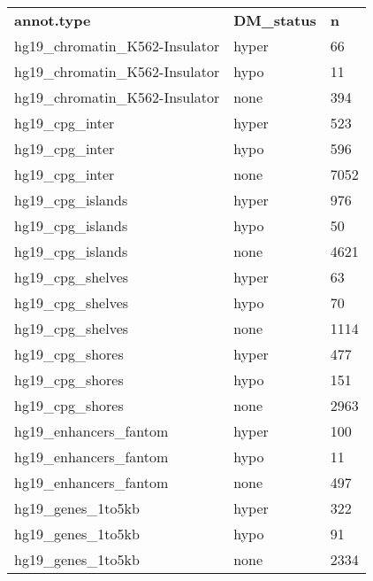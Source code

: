\newpage

\begin{table}[!ht]
\small
\centering
\begin{tabular}{lll}
\textbf{annot.type}             & \textbf{DM\_status} & \textbf{n} \\
hg19\_chromatin\_K562-Insulator & hyper               & 66         \\
hg19\_chromatin\_K562-Insulator & hypo                & 11         \\
hg19\_chromatin\_K562-Insulator & none                & 394        \\
hg19\_cpg\_inter                & hyper               & 523        \\
hg19\_cpg\_inter                & hypo                & 596        \\
hg19\_cpg\_inter                & none                & 7052       \\
hg19\_cpg\_islands              & hyper               & 976        \\
hg19\_cpg\_islands              & hypo                & 50         \\
hg19\_cpg\_islands              & none                & 4621       \\
hg19\_cpg\_shelves              & hyper               & 63         \\
hg19\_cpg\_shelves              & hypo                & 70         \\
hg19\_cpg\_shelves              & none                & 1114       \\
hg19\_cpg\_shores               & hyper               & 477        \\
hg19\_cpg\_shores               & hypo                & 151        \\
hg19\_cpg\_shores               & none                & 2963       \\
hg19\_enhancers\_fantom         & hyper               & 100        \\
hg19\_enhancers\_fantom         & hypo                & 11         \\
hg19\_enhancers\_fantom         & none                & 497        \\
hg19\_genes\_1to5kb             & hyper               & 322        \\
hg19\_genes\_1to5kb             & hypo                & 91         \\
hg19\_genes\_1to5kb             & none                & 2334       \\

\end{tabular}
\end{table}
